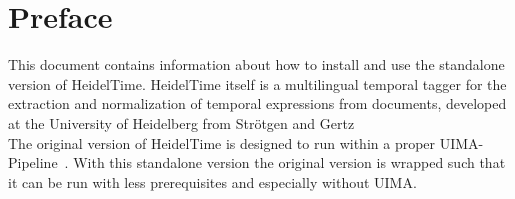 \section{Preface}\label{sec:Preface}
This document contains information about how to install and use the standalone version of HeidelTime. HeidelTime itself is a multilingual temporal tagger for the extraction and normalization of temporal expressions from documents, developed at the University of Heidelberg from Str\"otgen and Gertz~\cite{StroetgenGertz2010_SemEval, HeidelTime, StroetgenGertz2013_LRE}\\
The original version of HeidelTime is designed to run within a proper UIMA-Pipeline~\cite{UIMA}. With this standalone version the original version is wrapped such that it can be run with less prerequisites and especially without UIMA.

